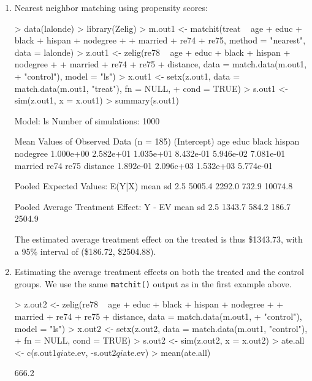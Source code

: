 \begin{enumerate}
\item Nearest neighbor matching using propensity scores: 

\begin{Schunk}
\begin{Sinput}
> data(lalonde)
> library(Zelig)
> m.out1 <- matchit(treat ~ age + educ + black + hispan + nodegree + 
+     married + re74 + re75, method = "nearest", data = lalonde)
> z.out1 <- zelig(re78 ~ age + educ + black + hispan + nodegree + 
+     married + re74 + re75 + distance, data = match.data(m.out1, 
+     "control"), model = "ls")
> x.out1 <- setx(z.out1, data = match.data(m.out1, "treat"), fn = NULL, 
+     cond = TRUE)
> s.out1 <- sim(z.out1, x = x.out1)
> summary(s.out1)
\end{Sinput}
\begin{Soutput}

  Model: ls 
  Number of simulations: 1000 

Mean Values of Observed Data (n = 185) 
(Intercept)         age        educ       black      hispan    nodegree 
  1.000e+00   2.582e+01   1.035e+01   8.432e-01   5.946e-02   7.081e-01 
    married        re74        re75    distance 
  1.892e-01   2.096e+03   1.532e+03   5.774e-01 

Pooled Expected Values: E(Y|X)
   mean      sd    2.5%   97.5% 
 5005.4  2292.0   732.9 10074.8 

Pooled Average Treatment Effect: Y - EV
  mean     sd   2.5%  97.5% 
1343.7  584.2  186.7 2504.9 

\end{Soutput}
\end{Schunk}
  
The estimated average treatment effect on the treated is thus 
\$1343.73, 
with a 95\% interval
of (\$186.72, 
\$2504.88).

\item Estimating the average treatment effects on both the treated and
  the control groups. We use the same {\tt matchit()} output as in the
  first example above.

\begin{Schunk}
\begin{Sinput}
> z.out2 <- zelig(re78 ~ age + educ + black + hispan + nodegree + 
+     married + re74 + re75 + distance, data = match.data(m.out1, 
+     "control"), model = "ls")
> x.out2 <- setx(z.out2, data = match.data(m.out1, "control"), 
+     fn = NULL, cond = TRUE)
> s.out2 <- sim(z.out2, x = x.out2)
> ate.all <- c(s.out1$qi$ate.ev, -s.out2$qi$ate.ev)
> mean(ate.all)
\end{Sinput}
\begin{Soutput}
[1] 666.2


\end{Soutput}
\end{Schunk}
\end{enumerate}
